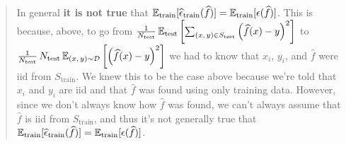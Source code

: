 \begin{quote}
    In general {\bf it is not true} that $\mathbb{E}_{\text{train}}[ \widehat{\epsilon}_{\text{train}} ( \widehat{f} )] = \mathbb{E}_{\text{train}} [ \epsilon (\widehat{f}) ]$. This is because, above, to go from $\frac{1}{N_{\textrm{test}}} \, \mathbb{E}_{\textrm{test}} \left[  \sum_{(x, \, y)\in S_{\textrm{test}}} \left( \widehat{f}(x) - y \right)^2 \right]$ to $\frac{1}{N_{\textrm{test}}} \, N_{\textrm{test}} \, \mathbb{E}_{(x,\, y) \sim \mathcal{D}} \left[  \left( \widehat{f}(x) - y \right)^2 \right]$ we had to know that $x_i$, $y_i$, and $\widehat{f}$ were iid from $S_{\textrm{train}}$. We knew this to be the case above because we're told that $x_i$ and $y_i$ are iid and that $\widehat{f}$ was found using only training data. However, since we don't always know how $\widehat{f}$ was found, we can't always assume that $\widehat{f}$ is iid from $S_{\textrm{train}}$, and thus it's not generally true that $\mathbb{E}_{\text{train}}[ \widehat{\epsilon}_{\text{train}} ( \widehat{f} )] = \mathbb{E}_{\text{train}} [ \epsilon (\widehat{f}) ]$.
\end{quote}

